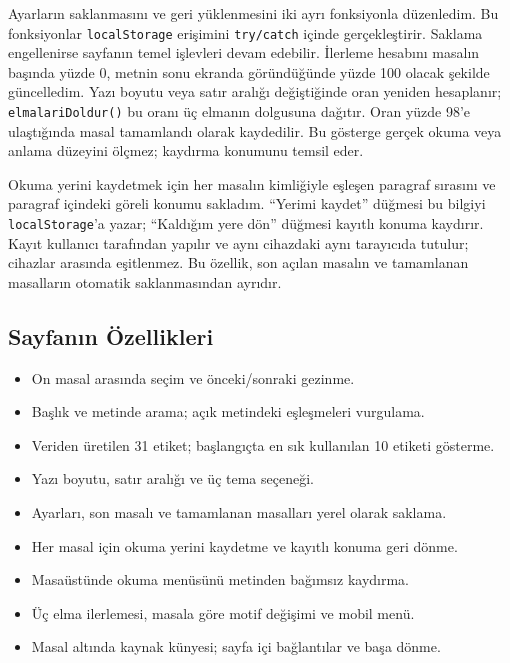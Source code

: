 \documentclass[12pt,a4paper]{article}
\begin{document}
Ayarların saklanmasını ve geri yüklenmesini iki ayrı fonksiyonla düzenledim. Bu fonksiyonlar \texttt{localStorage} erişimini \texttt{try/catch} içinde gerçekleştirir. Saklama engellenirse sayfanın temel işlevleri devam edebilir. İlerleme hesabını masalın başında yüzde 0, metnin sonu ekranda göründüğünde yüzde 100 olacak şekilde güncelledim. Yazı boyutu veya satır aralığı değiştiğinde oran yeniden hesaplanır; \texttt{elmalariDoldur()} bu oranı üç elmanın dolgusuna dağıtır. Oran yüzde 98'e ulaştığında masal tamamlandı olarak kaydedilir. Bu gösterge gerçek okuma veya anlama düzeyini ölçmez; kaydırma konumunu temsil eder.

Okuma yerini kaydetmek için her masalın kimliğiyle eşleşen paragraf sırasını ve paragraf içindeki göreli konumu sakladım. ``Yerimi kaydet'' düğmesi bu bilgiyi \texttt{localStorage}'a yazar; ``Kaldığım yere dön'' düğmesi kayıtlı konuma kaydırır. Kayıt kullanıcı tarafından yapılır ve aynı cihazdaki aynı tarayıcıda tutulur; cihazlar arasında eşitlenmez. Bu özellik, son açılan masalın ve tamamlanan masalların otomatik saklanmasından ayrıdır.

\subsection{Sayfanın Özellikleri}
\begin{itemize}
\item On masal arasında seçim ve önceki/sonraki gezinme.
\item Başlık ve metinde arama; açık metindeki eşleşmeleri vurgulama.
\item Veriden üretilen 31 etiket; başlangıçta en sık kullanılan 10 etiketi gösterme.
\item Yazı boyutu, satır aralığı ve üç tema seçeneği.
\item Ayarları, son masalı ve tamamlanan masalları yerel olarak saklama.
\item Her masal için okuma yerini kaydetme ve kayıtlı konuma geri dönme.
\item Masaüstünde okuma menüsünü metinden bağımsız kaydırma.
\item Üç elma ilerlemesi, masala göre motif değişimi ve mobil menü.
\item Masal altında kaynak künyesi; sayfa içi bağlantılar ve başa dönme.
\end{itemize}
\end{document}
